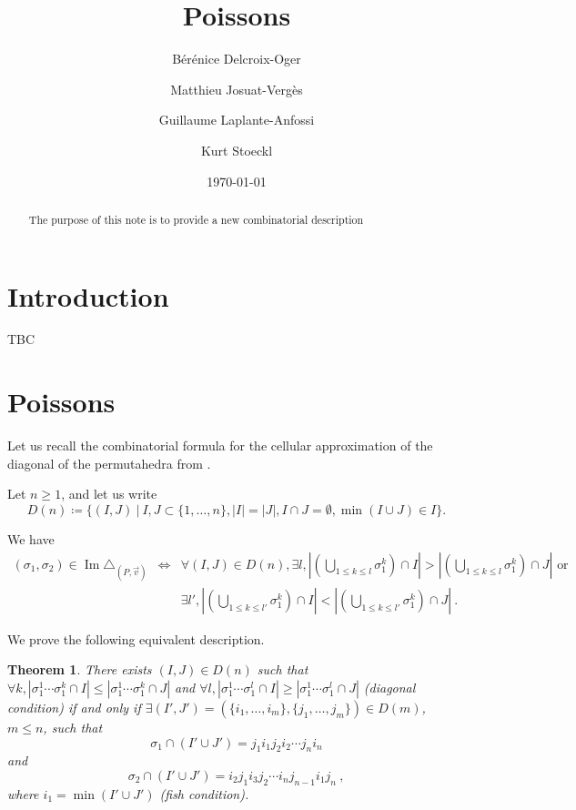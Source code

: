 \documentclass[11pt]{amsart}
\title{Poissons}
\author{B\'er\'enice Delcroix-Oger}
\author{Matthieu Josuat-Verg\`es}
\author{Guillaume Laplante-Anfossi}
\author{Kurt Stoeckl}
\date{\today}
\newtheorem{thm}{Theorem}[section]
\theoremstyle{definition}
\theoremstyle{remark}
\numberwithin{equation}{section}
\newcommand{\0}{\color{blue}{\mathsf{0}}}
\DeclareMathOperator{\Ima}{Im} %
\begin{document}

\begin{abstract}
The purpose of this note is to provide a new combinatorial description 
\end{abstract}


\maketitle

\section{Introduction}

TBC


\section{Poissons}

Let us recall the combinatorial formula for the cellular approximation of the diagonal of the permutahedra from \cite{LA21}.

Let $n\geq 1$, and let us write \[ D(n) \coloneqq \{(I,J) \ | \ I,J\subset\{1,\ldots,n\}, |I|=|J|, I\cap J=\emptyset, \min(I\cup J)\in I \}. \] 

We have
\begin{eqnarray*}
    (\sigma_1,\sigma_2)\in \Ima\triangle_{(P,\vec v)} 
    & \iff & \forall (I,J) \in D(n), \exists l , 
    \left| \left(\bigcup_{1\leq k \leq l} \sigma_1^{k} \right)\cap I \right|
    >
    \left| \left(\bigcup_{1\leq k \leq l} \sigma_1^{k} \right)\cap J \right| \text{ or } \\
    && \exists l' , 
    \left| \left(\bigcup_{1\leq k \leq l'} \sigma_1^{k} \right)\cap I \right|
    <
    \left| \left(\bigcup_{1\leq k \leq l'} \sigma_1^{k} \right)\cap J \right|  \ .
\end{eqnarray*}

We prove the following equivalent description. 

\begin{thm} There exists $(I,J) \in D(n)$ such that $\forall k, |\sigma_1^1\cdots\sigma_1^k \cap I| \leq |\sigma_1^1\cdots\sigma_1^k \cap J|$ and $\forall l, |\sigma_1^1\cdots\sigma_1^l \cap I| \geq |\sigma_1^1\cdots\sigma_1^l \cap J|$ (diagonal condition) if and only if $\exists (I',J')=(\{i_1,\ldots,i_m\},\{j_1,\ldots,j_m\}) \in D(m)$, $m\leq n$, such that \[\sigma_1 \cap (I'\cup J')=j_1 i_1 j_2 i_2 \cdots j_n i_n \] and \[ \sigma_2 \cap (I'\cup J') = i_2 j_1 i_3 j_2 \cdots i_n j_{n-1} i_1 j_n \ , \] where $i_1 = \min (I' \cup J')$ (fish condition). 
\end{thm}
\end{document}

